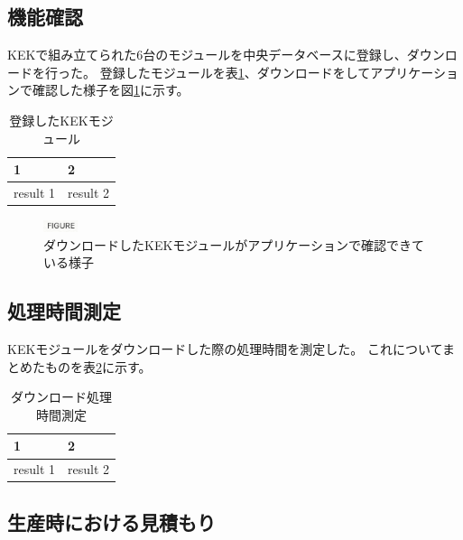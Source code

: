 \subsection{機能確認}
KEKで組み立てられた6台のモジュールを中央データベースに登録し、ダウンロードを行った。
登録したモジュールを表\ref{registered_kek_module}、ダウンロードをしてアプリケーションで確認した様子を図\ref{registered_kek_module_viewer}に示す。

\begin{table}[tbp]
\begin{center}
\caption[登録したKEKモジュール]{登録したKEKモジュール}
\label{registered_kek_module}
  \begin{tabular}{|ll|} \hline
    1 & 2 \\ \hline
    result 1 & result 2 \\ \hline 
  \end{tabular}
\end{center}
\end{table}

\begin{figure}[bpt]\centering
\includegraphics[width=1cm]{figure}
\caption[ダウンロードしたKEKモジュールがアプリケーションで確認できている様子]{ダウンロードしたKEKモジュールがアプリケーションで確認できている様子}
\label{registered_kek_module_viewer}
\end{figure}

\subsection{処理時間測定}
KEKモジュールをダウンロードした際の処理時間を測定した。
これについてまとめたものを表\ref{download_measurement}に示す。

\begin{table}[tbp]
\begin{center}
\caption[ダウンロード処理時間測定]{ダウンロード処理時間測定}
\label{download_measurement}
  \begin{tabular}{|ll|} \hline
    1 & 2 \\ \hline
    result 1 & result 2 \\ \hline 
  \end{tabular}
\end{center}
\end{table}

\subsection{生産時における見積もり}

